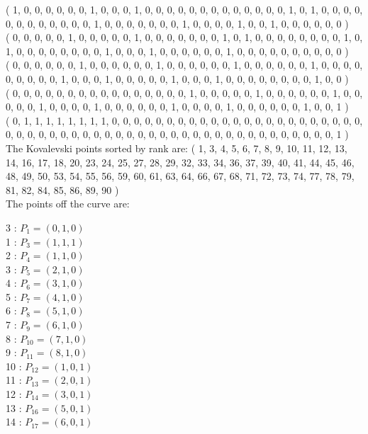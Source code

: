 \documentclass{article}
\begin{document}
{( 1, 0, 0, 0, 0, 0, 0, 1, 0, 0, 0, 1, 0, 0, 0, 0, 0, 0, 0, 0, 0, 0, 0, 0, 0, 1, 0, 1, 0, 0, 0, 0, 0, 0, 0, 0, 0, 0, 0, 0, 1, 0, 0, 0, 0, 0, 0, 0, 1, 0, 0, 0, 0, 1, 0, 0, 1, 0, 0, 0, 0, 0, 0 )\\
( 0, 0, 0, 0, 0, 1, 0, 0, 0, 0, 0, 1, 0, 0, 0, 0, 0, 0, 0, 1, 0, 1, 0, 0, 0, 0, 0, 0, 0, 0, 1, 0, 1, 0, 0, 0, 0, 0, 0, 0, 0, 1, 0, 0, 0, 1, 0, 0, 0, 0, 0, 0, 1, 0, 0, 0, 0, 0, 0, 0, 0, 0, 0 )\\
( 0, 0, 0, 0, 0, 0, 1, 0, 0, 0, 0, 0, 0, 1, 0, 0, 0, 0, 0, 0, 1, 0, 0, 0, 0, 0, 0, 1, 0, 0, 0, 0, 0, 0, 0, 0, 0, 1, 0, 0, 0, 1, 0, 0, 0, 0, 0, 1, 0, 0, 0, 1, 0, 0, 0, 0, 0, 0, 0, 0, 1, 0, 0 )\\
( 0, 0, 0, 0, 0, 0, 0, 0, 0, 0, 0, 0, 0, 0, 0, 0, 1, 0, 0, 0, 0, 0, 1, 0, 0, 0, 0, 0, 0, 1, 0, 0, 0, 0, 0, 1, 0, 0, 0, 0, 1, 0, 0, 0, 0, 0, 0, 1, 0, 0, 0, 0, 1, 0, 0, 0, 0, 0, 0, 1, 0, 0, 1 )\\
( 0, 1, 1, 1, 1, 1, 1, 1, 1, 0, 0, 0, 0, 0, 0, 0, 0, 0, 0, 0, 0, 0, 0, 0, 0, 0, 0, 0, 0, 0, 0, 0, 0, 0, 0, 0, 0, 0, 0, 0, 0, 0, 0, 0, 0, 0, 0, 0, 0, 0, 0, 0, 0, 0, 0, 0, 0, 0, 0, 0, 0, 0, 1 )\\
The Kovalevski points sorted by rank are: 
( 1, 3, 4, 5, 6, 7, 8, 9, 10, 11, 12, 13, 14, 16, 17, 18, 20, 23, 24, 25, 27, 28, 29, 32, 33, 34, 36, 37, 39, 40, 41, 44, 45, 46, 48, 49, 50, 53, 54, 55, 56, 59, 60, 61, 63, 64, 66, 67, 68, 71, 72, 73, 74, 77, 78, 79, 81, 82, 84, 85, 86, 89, 90 )\\
The points off the curve are: \\
\begin{multicols}{3}
 : $P_{1}=( 0, 1, 0 )$\\
1 : $P_{3}=( 1, 1, 1 )$\\
2 : $P_{4}=( 1, 1, 0 )$\\
3 : $P_{5}=( 2, 1, 0 )$\\
4 : $P_{6}=( 3, 1, 0 )$\\
5 : $P_{7}=( 4, 1, 0 )$\\
6 : $P_{8}=( 5, 1, 0 )$\\
7 : $P_{9}=( 6, 1, 0 )$\\
8 : $P_{10}=( 7, 1, 0 )$\\
9 : $P_{11}=( 8, 1, 0 )$\\
10 : $P_{12}=( 1, 0, 1 )$\\
11 : $P_{13}=( 2, 0, 1 )$\\
12 : $P_{14}=( 3, 0, 1 )$\\
13 : $P_{16}=( 5, 0, 1 )$\\
14 : $P_{17}=( 6, 0, 1 )$\\

\end{multicols}}
\end{document}
